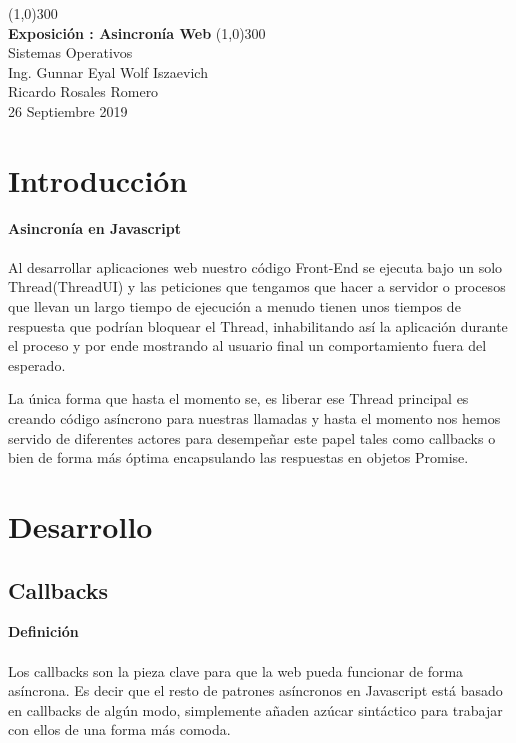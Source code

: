 \documentclass[a4paper, 12pt]{article}
\begin{document}
\begin{titlepage}
	\begin{center}
		\line(1,0){300} \\
		\huge{\bfseries Exposici\'on : Asincron\'ia  Web}
		\line(1,0){300} \\
		Sistemas Operativos\\
		{\normalsize Ing. Gunnar Eyal Wolf Iszaevich }\\
		{\normalsize Ricardo Rosales Romero }\\
		{\small 26 Septiembre 2019}
	\end{center}
\end{titlepage}

\setcounter{page}{2}
\fancyhf{}
\renewcommand{\headrulewidth}{2pt}
\renewcommand{\footrulewidth}{1pt}
\fancyhead[LE]{\leftmark}
\fancyhead[RO]{\nouppercase{\rightmark}}
\fancyfoot[LE, RO]{\thepage}


\section*{Introducci\'on}


{\bf Asincron\'ia en Javascript}\\ \\
Al desarrollar aplicaciones web nuestro c\'odigo Front-End se ejecuta bajo un solo Thread(ThreadUI) y las peticiones que tengamos que hacer a servidor o procesos que llevan un largo tiempo de ejecuci\'on a menudo tienen unos tiempos de respuesta que podr\'ian bloquear el Thread, inhabilitando as\'i la aplicaci\'on durante el proceso y por ende mostrando al usuario final un comportamiento fuera del esperado.

La \'unica forma que hasta el momento se,  es liberar ese Thread principal es creando c\'odigo as\'incrono para nuestras llamadas y hasta el momento nos hemos servido de diferentes actores para desempe\~nar este papel tales como callbacks o bien de forma m\'as \'optima encapsulando las respuestas en objetos Promise.\\


\section*{Desarrollo}


\subsection*{Callbacks}
{\bf Definici\'on}\\ \\
Los callbacks son la pieza clave para que la web pueda funcionar de forma as\'incrona. Es decir que el  resto de patrones as\'incronos en Javascript est\'a basado en callbacks de alg\'un modo, simplemente a\~naden az\'ucar sint\'actico para trabajar con ellos de una forma m\'as comoda.
\end{document}
